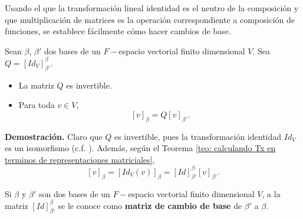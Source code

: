 Usando el que la transformación lineal identidad es el neutro de
la composición y que multiplicación de matrices es la operación 
correspondiente a composición de funciones, se establece fácilmente
cómo hacer cambios de base.

\begin{teo}
Sean $\beta$, $\beta'$ dos bases de un $F-$espacio vectorial finito 
dimensional $V$. Sea $Q = [Id_{V}]_{\beta'}^{\beta}$.
\begin{itemize}
	\item La matriz $Q$ es invertible.
	\item Para toda $v \in V$,
	\begin{equation}
		\label{eq: v beta igual a id por v beta prima}
		[v]_{\beta} = Q [v]_{\beta'}.
	\end{equation}
\end{itemize}
\end{teo}
\noindent
\textbf{Demostración.}
Claro que $Q$ es invertible, pues la transformación identidad
$Id_{V}$ es un isomorfismo (c.f. ).
Además, según 
el Teorema \ref{teo: calculando Tx en terminos de representaciones matriciales},
\[
[v]_{\beta} = [Id_{V}(v)]_{\beta} = [Id]_{\beta'}^{\beta}[v]_{\beta'}.
\]
\QEDB
\vspace{0.2cm}

\begin{defi}
Si $\beta$ y $\beta'$ son dos bases de un $F-$espacio vectorial
finito dimensional $V$, a la matriz $[Id]_{\beta'}^{\beta}$
se le conoce como \textbf{matriz de cambio de base} de 
$\beta'$ a $\beta$.
\end{defi}


